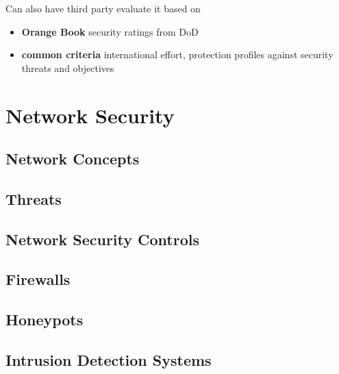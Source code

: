 \documentclass[]{article}
\theoremstyle{definition}
\begin{document}
	Can also have third party evaluate it based on
	\begin{itemize}
		\item \textbf{Orange Book} security ratings from DoD
		\item \textbf{common criteria} international effort, protection profiles against security threats and objectives
	\end{itemize}


	\section{Network Security}
	\subsection{Network Concepts}
	\subsection{Threats}
	\subsection{Network Security Controls}
	\subsection{Firewalls}
	\subsection{Honeypots}
	\subsection{Intrusion Detection Systems}
\end{document}
